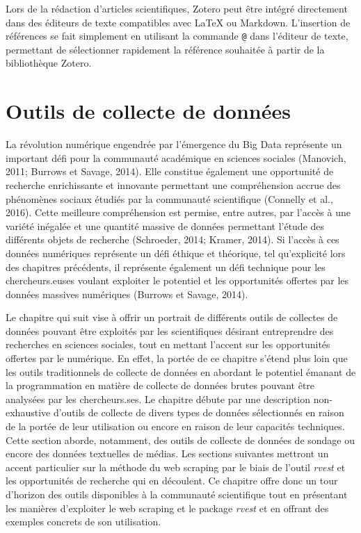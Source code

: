 \documentclass[
  letterpaper,
  DIV=11,
  numbers=noendperiod]{scrreprt}
\begin{document}
Lors de la rédaction d'articles scientifiques, Zotero peut être intégré
directement dans des éditeurs de texte compatibles avec LaTeX ou
Markdown. L'insertion de références se fait simplement en utilisant la
commande \texttt{@} dans l'éditeur de texte, permettant de sélectionner
rapidement la référence souhaitée à partir de la bibliothèque Zotero.


\hypertarget{sec-chap5}{%
\chapter{Outils de collecte de données}\label{sec-chap5}}

La révolution numérique engendrée par l'émergence du Big Data représente
un important défi pour la communauté académique en sciences sociales
(Manovich, 2011; Burrows et Savage, 2014). Elle constitue également une
opportunité de recherche enrichissante et innovante permettant une
compréhension accrue des phénomènes sociaux étudiés par la communauté
scientifique (Connelly et al., 2016). Cette meilleure compréhension est
permise, entre autres, par l'accès à une variété inégalée et une
quantité massive de données permettant l'étude des différents objets de
recherche (Schroeder, 2014; Kramer, 2014). Si l'accès à ces données
numériques représente un défi éthique et théorique, tel qu'explicité
lors des chapitres précédents, il représente également un défi technique
pour les chercheurs.euses voulant exploiter le potentiel et les
opportunités offertes par les données massives numériques (Burrows et
Savage, 2014).

Le chapitre qui suit vise à offrir un portrait de différents outils de
collectes de données pouvant être exploités par les scientifiques
désirant entreprendre des recherches en sciences sociales, tout en
mettant l'accent sur les opportunités offertes par le numérique. En
effet, la portée de ce chapitre s'étend plus loin que les outils
traditionnels de collecte de données en abordant le potentiel émanant de
la programmation en matière de collecte de données brutes pouvant être
analysées par les chercheurs.ses. Le chapitre débute par une description
non-exhaustive d'outils de collecte de divers types de données
sélectionnés en raison de la portée de leur utilisation ou encore en
raison de leur capacités techniques. Cette section aborde, notamment,
des outils de collecte de données de sondage ou encore des données
textuelles de médias. Les sections suivantes mettront un accent
particulier sur la méthode du web scraping par le biais de l'outil
\emph{rvest} et les opportunités de recherche qui en découlent. Ce
chapitre offre donc un tour d'horizon des outils disponibles à la
communauté scientifique tout en présentant les manières d'exploiter le
web scraping et le package \emph{rvest} et en offrant des exemples
concrets de son utilisation.
\end{document}
